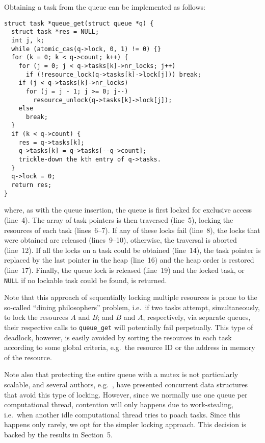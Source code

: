 \documentclass[fleqn,10pt]{wlpeerj}
\begin{document}
Obtaining a task from the queue can be implemented as follows:
\begin{center}\begin{minipage}{0.9\textwidth}
    \begin{lstlisting}
struct task *queue_get(struct queue *q) {
  struct task *res = NULL;
  int j, k;
  while (atomic_cas(q->lock, 0, 1) != 0) {}
  for (k = 0; k < q->count; k++) {
    for (j = 0; j < q->tasks[k]->nr_locks; j++)
      if (!resource_lock(q->tasks[k]->lock[j])) break;
    if (j < q->tasks[k]->nr_locks)
      for (j = j - 1; j >= 0; j--)
        resource_unlock(q->tasks[k]->lock[j]);
    else
      break;
  }
  if (k < q->count) {
    res = q->tasks[k];
    q->tasks[k] = q->tasks[--q->count];
    trickle-down the kth entry of q->tasks.
  }
  q->lock = 0;
  return res;
}
    \end{lstlisting}
\end{minipage}\end{center}
\noindent where, as with the queue insertion, the queue is first
locked for exclusive access (line~4).
The array of task pointers is then traversed (line~5),
locking the resources of each task (lines~6--7).
If any of these locks fail (line~8), the locks that were obtained
are released (lines~9--10), otherwise, the traversal is aborted
(line~12).
If all the locks on a task could be obtained (line~14), the
task pointer is replaced by the last pointer in the heap (line~16)
and the heap order is restored (line~17).
Finally, the queue lock is released (line~19) and the locked task,
or {\tt NULL} if no lockable task could be found, is returned.

Note that this approach of sequentially locking multiple resources
is prone to the so-called ``dining philosophers'' problem, i.e.~if
two tasks attempt, simultaneously, to lock the resources $A$ and $B$;
and $B$ and $A$, respectively, via separate queues, their respective calls
to {\tt queue\_get} will potentially fail perpetually.
This type of deadlock, however, is easily avoided by sorting the
resources in each task according to some global criteria, e.g.~the
resource ID or the address in memory of the resource.

Note also that protecting the entire queue with a mutex
is not particularly scalable, and several authors, e.g.~\cite{ref:Sundell2003},
have presented concurrent data structures that avoid this type
of locking.
However, since we normally use one queue per computational thread,
contention will only happens due to work-stealing, i.e.~when
another idle computational thread tries to poach tasks.
Since this happens only rarely, we opt for the simpler locking approach.
This decision is backed by the results in Section~5.
\end{document}
